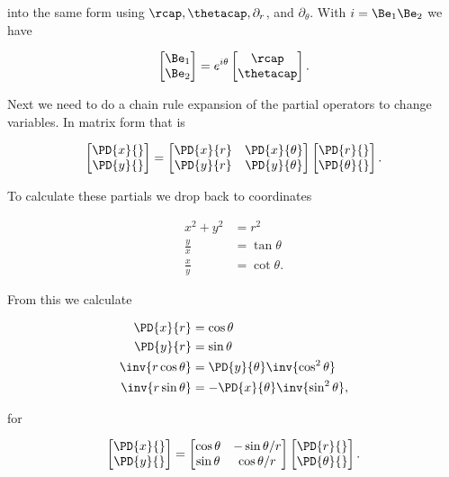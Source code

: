 into the same form using $\rcap, \thetacap, \partial_r$, and $\partial_\theta$.  With $i = \Be_1 \Be_2$ we have

\begin{align}\label{eqn:divGradCurLap:5}
\begin{bmatrix}
\Be_1 \\
\Be_2
\end{bmatrix}
=
e^{i\theta}
\begin{bmatrix}
\rcap \\
\thetacap
\end{bmatrix}.
\end{align}

Next we need to do a chain rule expansion of the partial operators to change variables.  In matrix form that is

\begin{align}\label{eqn:divGradCurLap:6}
\begin{bmatrix}
\PD{x}{} \\
\PD{y}{} 
\end{bmatrix}
= 
\begin{bmatrix}
\PD{x}{r} &          \PD{x}{\theta} \\
\PD{y}{r} &          \PD{y}{\theta} 
\end{bmatrix}
\begin{bmatrix}
\PD{r}{} \\
\PD{\theta}{} 
\end{bmatrix}.
\end{align}

To calculate these partials we drop back to coordinates

\begin{align}\label{eqn:divGradCurLap:7}
x^2 + y^2 &= r^2 \\
\frac{y}{x} &= \tan\theta \\
\frac{x}{y} &= \cot\theta.
\end{align}

From this we calculate

\begin{align}\label{eqn:divGradCurLap:8}
\PD{x}{r} &= \cos\theta \\
\PD{y}{r} &= \sin\theta \\ 
\inv{r\cos\theta} &= \PD{y}{\theta} \inv{\cos^2\theta} \\
\inv{r\sin\theta} &= -\PD{x}{\theta} \inv{\sin^2\theta},
\end{align}

for

\begin{align}\label{eqn:divGradCurLap:6e}
\begin{bmatrix}
\PD{x}{} \\
\PD{y}{} 
\end{bmatrix}
= 
\begin{bmatrix}
\cos\theta & -\sin\theta/r \\
\sin\theta & \cos\theta/r
\end{bmatrix}
\begin{bmatrix}
\PD{r}{} \\
\PD{\theta}{} 
\end{bmatrix}.
\end{align}

